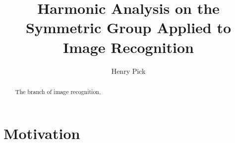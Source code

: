 \documentclass{IEEEtran}
\author{Henry Pick}
\title{Harmonic Analysis on the Symmetric Group Applied to Image Recognition}
\begin{document}
\maketitle
\begin{abstract}
    The branch of image recognition, 
\end{abstract}
\section{Motivation}
\section{}
\end{document}

